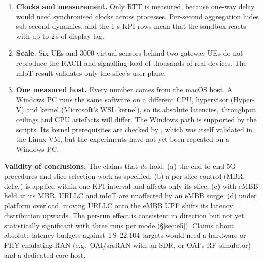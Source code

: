 \begin{enumerate}
  Differentiation by 5QI is therefore only signalled, not enforced. Our tc layer adds
  per-slice MBR and transport delay/loss, but it is a model of transport impairment, not of
  RAN scheduling.
\item \textbf{Clocks and measurement.} Only RTT is measured, because one-way delay would need
  synchronised clocks across processes. Per-second aggregation hides sub-second dynamics, and
  the 1-s KPI rows mean that the sandbox reacts with up to 2\,s of display lag.
\item \textbf{Scale.} Six UEs and 3000 virtual sensors behind two gateway UEs do not reproduce
  the RACH and signalling load of thousands of real devices. The mIoT result validates only
  the slice's user plane.
\item \textbf{One measured host.} Every number comes from the macOS host. A Windows PC runs
  the same software on a different CPU, hypervisor (Hyper-V) and kernel (Microsoft's WSL
  kernel), so its absolute latencies, throughput ceilings and CPU artefacts will differ. The
  Windows path is supported by the scripts. Its kernel prerequisites are checked by
  , which was itself validated in the Linux VM, but the experiments have
  not yet been repeated on a Windows PC.
\end{enumerate}

\noindent\textbf{Validity of conclusions.} The claims that \emph{do} hold:
(a) the end-to-end 5G procedures and slice selection work as specified;
(b) a per-slice control (MBR, delay) is applied within one KPI interval and affects only its
slice;
(c) with eMBB held at its MBR, URLLC and mIoT are unaffected by an eMBB surge;
(d) under platform overload, moving URLLC onto the eMBB UPF shifts its latency distribution
upwards. The per-run effect is consistent in direction but not yet statistically
significant with three runs per mode (\S\ref{sec:e5}).
Claims about absolute latency budgets against TS~22.104 targets would need a hardware or
PHY-emulating RAN (e.g.\ OAI/srsRAN with an SDR, or OAI's RF simulator) and a dedicated core host.

